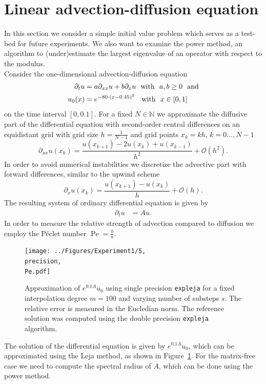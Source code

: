 \documentclass{scrartcl}
\begin{document}
	\section{Linear advection-diffusion equation}\label{sec:LinearADe}
	In this section we consider a simple initial value problem which serves as a test-bed for future experiments. We also want to examine the power method, an algorithm to (under)estimate the largest eigenvalue of an operator with respect to the modulus.\\
	Consider the one-dimensional advection-diffusion equation
	\begin{align}
	\begin{split}
	\partial_tu &= a\partial_{xx}u + b\partial_xu ~~\text{with}~~ a,b\ge 0 ~~\text{and}\\
	u_0(x) &= e^{-80\cdot(x-0.45)^2}\hphantom{,} ~~\text{with}~~ x\in[0,1]
	\end{split}\label{eq:LinearAdvDif}
	\end{align}
	on the time interval $[0,0.1]$. For a fixed $N\in\mathbb N$ we approximate the diffusive part of the differential equation with second-order central differences on an equidistant grid with grid size $h = \frac{1}{N-1}$ and grid points $x_k = kh$, $k=0\dots,N-1$
	\[\partial_{xx}u(x_k) = \frac{u(x_{k+1}) - 2u(x_k) + u(x_{k-1})}{{h}^2} + \mathcal{O}({h}^2).\]
	In order to avoid numerical instabilities we discretize the advective part with forward differences, similar to the upwind scheme
	\[\partial_{x}u(x_k) = \frac{u(x_{k+1}) - u(x_k)}{h} + \mathcal{O}(h).\]
	The resulting system of ordinary differential equation is given by
	\begin{align*}
	\partial_tu &= Au.
	\end{align*}
	In order to measure the relative strength of advection compared to diffusion we employ the P\'eclet number $\operatorname{Pe} = \frac{b}{a}$.
	\begin{figure}[ht]
		\newcommand{\precision}{single}
		\newcommand{\Pe}{Pe=10.0}
		\centering
		\texttt{[image: ../Figures/Experiment1/5, \\precision, \\Pe.pdf]}
		\caption{Approximation of $e^{0.1A}u_0$ using single precision \texttt{expleja} for a fixed interpolation degree $m=100$ and varying number of substeps $s$. The relative error is measured in the Eucledian norm. The reference solution was computed using the double precision \texttt{expleja} algorithm.}
		\label{fig:Experiment1}
	\end{figure} 
	\noindent The solution of the differential equation is given by $e^{0.1A}u_0$, which can be approximated using the Leja method, as shown in Figure~\ref{fig:Experiment1}. For the matrix-free case we need to compute the spectral radius of $A$, which can be done using the power method.
	
\end{document}
